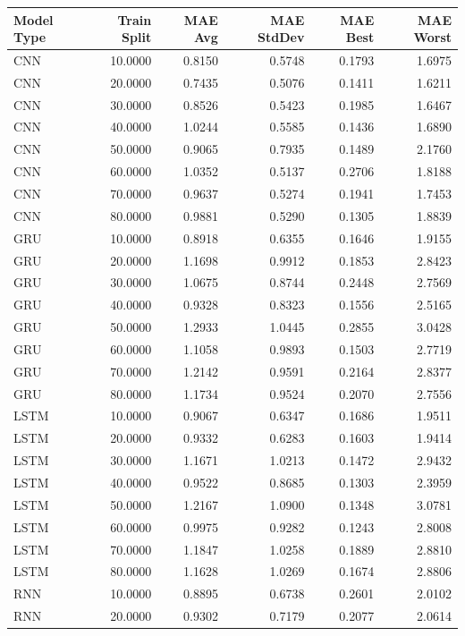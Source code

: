 \begin{tabular}{lrrrrr}
\toprule
Model Type & Train Split & MAE Avg & MAE StdDev & MAE Best & MAE Worst \\
\midrule
CNN & 10.0000 & 0.8150 & 0.5748 & 0.1793 & 1.6975 \\
CNN & 20.0000 & 0.7435 & 0.5076 & 0.1411 & 1.6211 \\
CNN & 30.0000 & 0.8526 & 0.5423 & 0.1985 & 1.6467 \\
CNN & 40.0000 & 1.0244 & 0.5585 & 0.1436 & 1.6890 \\
CNN & 50.0000 & 0.9065 & 0.7935 & 0.1489 & 2.1760 \\
CNN & 60.0000 & 1.0352 & 0.5137 & 0.2706 & 1.8188 \\
CNN & 70.0000 & 0.9637 & 0.5274 & 0.1941 & 1.7453 \\
CNN & 80.0000 & 0.9881 & 0.5290 & 0.1305 & 1.8839 \\
GRU & 10.0000 & 0.8918 & 0.6355 & 0.1646 & 1.9155 \\
GRU & 20.0000 & 1.1698 & 0.9912 & 0.1853 & 2.8423 \\
GRU & 30.0000 & 1.0675 & 0.8744 & 0.2448 & 2.7569 \\
GRU & 40.0000 & 0.9328 & 0.8323 & 0.1556 & 2.5165 \\
GRU & 50.0000 & 1.2933 & 1.0445 & 0.2855 & 3.0428 \\
GRU & 60.0000 & 1.1058 & 0.9893 & 0.1503 & 2.7719 \\
GRU & 70.0000 & 1.2142 & 0.9591 & 0.2164 & 2.8377 \\
GRU & 80.0000 & 1.1734 & 0.9524 & 0.2070 & 2.7556 \\
LSTM & 10.0000 & 0.9067 & 0.6347 & 0.1686 & 1.9511 \\
LSTM & 20.0000 & 0.9332 & 0.6283 & 0.1603 & 1.9414 \\
LSTM & 30.0000 & 1.1671 & 1.0213 & 0.1472 & 2.9432 \\
LSTM & 40.0000 & 0.9522 & 0.8685 & 0.1303 & 2.3959 \\
LSTM & 50.0000 & 1.2167 & 1.0900 & 0.1348 & 3.0781 \\
LSTM & 60.0000 & 0.9975 & 0.9282 & 0.1243 & 2.8008 \\
LSTM & 70.0000 & 1.1847 & 1.0258 & 0.1889 & 2.8810 \\
LSTM & 80.0000 & 1.1628 & 1.0269 & 0.1674 & 2.8806 \\
RNN & 10.0000 & 0.8895 & 0.6738 & 0.2601 & 2.0102 \\
RNN & 20.0000 & 0.9302 & 0.7179 & 0.2077 & 2.0614 \\

\end{tabular}
